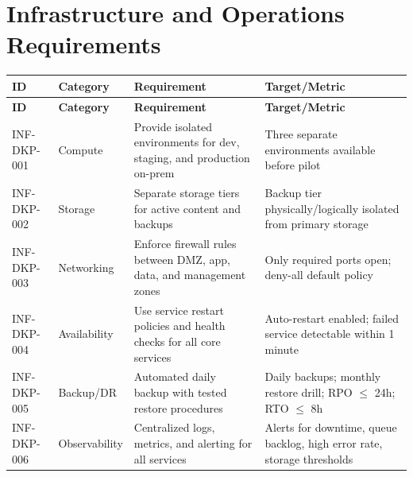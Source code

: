 \documentclass[12pt,a4paper]{report}
\begin{document}
\section{Infrastructure and Operations Requirements}
\begin{longtable}{|p{2.2cm}|p{3.2cm}|p{5.2cm}|p{3.4cm}|}
\hline
\textbf{ID} & \textbf{Category} & \textbf{Requirement} & \textbf{Target/Metric} \\ \hline
\endfirsthead
\hline
\textbf{ID} & \textbf{Category} & \textbf{Requirement} & \textbf{Target/Metric} \\ \hline
\endhead
INF-DKP-001 & Compute & Provide isolated environments for dev, staging, and production on-prem & Three separate environments available before pilot \\ \hline
INF-DKP-002 & Storage & Separate storage tiers for active content and backups & Backup tier physically/logically isolated from primary storage \\ \hline
INF-DKP-003 & Networking & Enforce firewall rules between DMZ, app, data, and management zones & Only required ports open; deny-all default policy \\ \hline
INF-DKP-004 & Availability & Use service restart policies and health checks for all core services & Auto-restart enabled; failed service detectable within 1 minute \\ \hline
INF-DKP-005 & Backup/DR & Automated daily backup with tested restore procedures & Daily backups; monthly restore drill; RPO $\leq$ 24h; RTO $\leq$ 8h \\ \hline
INF-DKP-006 & Observability & Centralized logs, metrics, and alerting for all services & Alerts for downtime, queue backlog, high error rate, storage thresholds \\ \hline
\end{longtable}
\end{document}
